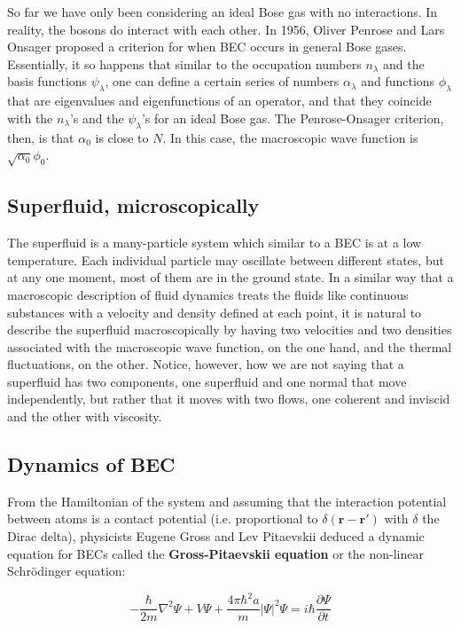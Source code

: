 \documentclass{article}
\begin{document}
So far we have only been considering an ideal Bose gas with no interactions.  In reality, the bosons do interact with each other.  In 1956, Oliver Penrose and Lars Onsager proposed a criterion for when BEC occurs in general Bose gases.  Essentially, it so happens that similar to the occupation numbers $n_\lambda$ and the basis functions $\psi_\lambda$, one can define a certain series of numbers $\alpha_\lambda$ and functions $\phi_\lambda$ that are eigenvalues and eigenfunctions of an operator, and that they coincide with the $n_\lambda$'s and the $\psi_\lambda$'s for an ideal Bose gas.  The Penrose-Onsager criterion, then, is that $\alpha_0$ is close to $N$.  In this case, the macroscopic wave function is $\sqrt{\alpha_0} \phi_0$. 

\subsection{Superfluid, microscopically}

The superfluid is a many-particle system which similar to a BEC is at a low temperature.  Each individual particle may oscillate between different states, but at any one moment, most of them are in the ground state.  In a similar way that a macroscopic description of fluid dynamics treats the fluids like continuous substances with a velocity and density defined at each point, it is natural to describe the superfluid macroscopically by having two velocities and two densities associated with the macroscopic wave function, on the one hand, and the thermal fluctuations, on the other.  Notice, however, how we are not saying that a superfluid has two components, one superfluid and one normal that move independently, but rather that it moves with two flows, one coherent and inviscid and the other with viscosity.

\subsection{Dynamics of BEC}

From the Hamiltonian of the system and assuming that the interaction potential between atoms is a contact potential (i.e. proportional to $\delta(\mathbf{r}-\mathbf{r}')$ with $\delta$ the Dirac delta), physicists Eugene Gross and Lev Pitaevskii deduced a dynamic equation for BECs called the \textbf{Gross-Pitaevskii equation} or the non-linear Schrödinger equation:

\[-\frac{\hbar}{2m}\nabla^2\Psi+V\Psi+\frac{4\pi\hbar^2a}{m}|\Psi|^2\Psi=i\hbar \frac{\partial \Psi}{\partial t}\]
\end{document}
